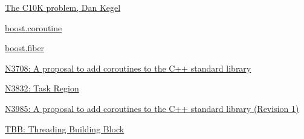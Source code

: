 \begin{thebibliography}{99}

        \href{http://www.kegel.com/c10k.html}
        {The C10K problem, Dan Kegel}

        \href{http://www.boost.org/doc/libs/1_55_0/libs/coroutine/doc/html/index.html}
        {boost.coroutine}

        \href{http://olk.github.io/libs/fiber/doc/html/}
        {boost.fiber}

        \href{http://www.open-std.org/jtc1/sc22/wg21/docs/papers/2013/n3708.pdf}
        {N3708: A proposal to add coroutines to the C++ standard library}

        \href{http://www.open-std.org/jtc1/sc22/wg21/docs/papers/2014/n3832.pdf}
        {N3832: Task Region} 

        \href{http://www.open-std.org/jtc1/sc22/wg21/docs/papers/2014/n3985.pdf}
        {N3985: A proposal to add coroutines to the C++ standard library (Revision 1)}

        \href{https://www.threadingbuildingblocks.org}
        {TBB: Threading Building Block}

\end{thebibliography}
